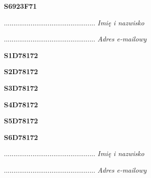\begin{turn}{90}\huge \textbf{S6923F71}\end{turn}

\begin{turn}{90}\begin{minipage}{\linewidth} \vspace{20mm} ................................................  \textit{Imię i nazwisko}\end{minipage}\end{turn}

\begin{turn}{90}\begin{minipage}{\linewidth} \vspace{20mm} ................................................  \textit{Adres e-mailowy}\end{minipage}\end{turn}

\begin{turn}{90}\huge \textbf{S1D78172}\end{turn}

\begin{turn}{90}\huge \textbf{S2D78172}\end{turn}

\begin{turn}{90}\huge \textbf{S3D78172}\end{turn}

\begin{turn}{90}\huge \textbf{S4D78172}\end{turn}

\begin{turn}{90}\huge \textbf{S5D78172}\end{turn}

\begin{turn}{90}\huge \textbf{S6D78172}\end{turn}

\begin{turn}{90}\begin{minipage}{\linewidth} \vspace{20mm} ................................................  \textit{Imię i nazwisko}\end{minipage}\end{turn}

\begin{turn}{90}\begin{minipage}{\linewidth} \vspace{20mm} ................................................  \textit{Adres e-mailowy}\end{minipage}\end{turn}

